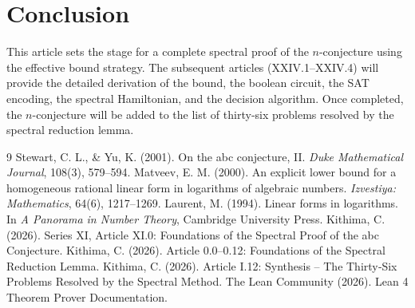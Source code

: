 \documentclass[11pt,a4paper]{article}
\begin{document}
\section{Conclusion}

This article sets the stage for a complete spectral proof of the $n$-conjecture using the effective bound strategy. The subsequent articles (XXIV.1–XXIV.4) will provide the detailed derivation of the bound, the boolean circuit, the SAT encoding, the spectral Hamiltonian, and the decision algorithm. Once completed, the $n$-conjecture will be added to the list of thirty‑six problems resolved by the spectral reduction lemma.


\begin{thebibliography}{9}
  Stewart, C. L., \& Yu, K. (2001). On the abc conjecture, II. \emph{Duke Mathematical Journal}, 108(3), 579–594.
  Matveev, E. M. (2000). An explicit lower bound for a homogeneous rational linear form in logarithms of algebraic numbers. \emph{Izvestiya: Mathematics}, 64(6), 1217–1269.
  Laurent, M. (1994). Linear forms in logarithms. In \emph{A Panorama in Number Theory}, Cambridge University Press.
  Kithima, C. (2026). Series XI, Article XI.0: Foundations of the Spectral Proof of the abc Conjecture.
  Kithima, C. (2026). Article 0.0–0.12: Foundations of the Spectral Reduction Lemma.
  Kithima, C. (2026). Article I.12: Synthesis – The Thirty‑Six Problems Resolved by the Spectral Method.
  The Lean Community (2026). Lean 4 Theorem Prover Documentation.
\end{thebibliography}
\end{document}
